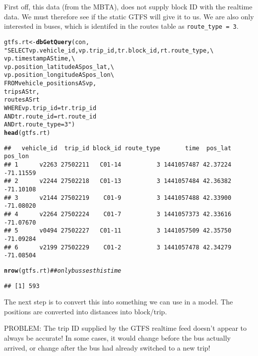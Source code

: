 \documentclass[10pt]{article}\usepackage[]{graphicx}\usepackage[]{color}
\makeatletter
\newcommand{\hlstr}[1]{\textcolor[rgb]{0.192,0.494,0.8}{#1}}%
\newcommand{\hlcom}[1]{\textcolor[rgb]{0.678,0.584,0.686}{\textit{#1}}}%
\newcommand{\hlstd}[1]{\textcolor[rgb]{0.345,0.345,0.345}{#1}}%
\newcommand{\hlkwb}[1]{\textcolor[rgb]{0.69,0.353,0.396}{#1}}%
\newcommand{\hlkwd}[1]{\textcolor[rgb]{0.737,0.353,0.396}{\textbf{#1}}}%
\newenvironment{kframe}{%
 \def\at@end@of@kframe{}%
 \ifinner\ifhmode%
  \def\at@end@of@kframe{\end{minipage}}%
  \begin{minipage}{\columnwidth}%
 \fi\fi%
 \def\FrameCommand##1{\hskip\@totalleftmargin \hskip-\fboxsep
 \colorbox{shadecolor}{##1}\hskip-\fboxsep
     \hskip-\linewidth \hskip-\@totalleftmargin \hskip\columnwidth}%
 \MakeFramed {\advance\hsize-\width
   \@totalleftmargin\z@ \linewidth\hsize
   \@setminipage}}%
 {\par\unskip\endMakeFramed%
 \at@end@of@kframe}
\newenvironment{knitrout}{}{} %
\makeatother
\begin{document}
First off, this data (from the MBTA), does not supply block ID with the realtime data.
We must therefore see if the static GTFS will give it to us.
We are also only interested in buses, which is identifed in the routes table as \texttt{route\_type = 3}.
\begin{knitrout}
\color{fgcolor}\begin{kframe}
\begin{alltt}
\hlstd{gtfs.rt} \hlkwb{<-} \hlkwd{dbGetQuery}\hlstd{(con,}
                      \hlstr{"SELECT vp.vehicle_id, vp.trip_id, tr.block_id, rt.route_type, \textbackslash{}
                              vp.timestamp AS time, \textbackslash{}
                              vp.position_latitude AS pos_lat, \textbackslash{}
                              vp.position_longitude AS pos_lon \textbackslash{}
                         FROM vehicle_positions AS vp, 
                              trips             AS tr, 
                              routes            AS rt
                        WHERE vp.trip_id    = tr.trip_id 
                          AND tr.route_id   = rt.route_id 
                          AND rt.route_type = 3"}\hlstd{)}
\hlkwd{head}\hlstd{(gtfs.rt)}
\end{alltt}
\begin{verbatim}
##   vehicle_id  trip_id block_id route_type       time  pos_lat   pos_lon
## 1      v2263 27502211   C01-14          3 1441057487 42.37224 -71.11559
## 2      v2244 27502218   C01-13          3 1441057484 42.36382 -71.10108
## 3      v2144 27502219    C01-9          3 1441057488 42.33900 -71.08020
## 4      v2264 27502224    C01-7          3 1441057373 42.33616 -71.07670
## 5      v0494 27502227   C01-11          3 1441057509 42.35750 -71.09284
## 6      v2199 27502229    C01-2          3 1441057478 42.34279 -71.08504
\end{verbatim}
\begin{alltt}
\hlkwd{nrow}\hlstd{(gtfs.rt)} \hlcom{## only busses this time}
\end{alltt}
\begin{verbatim}
## [1] 593
\end{verbatim}
\end{kframe}
\end{knitrout}
The next step is to convert this into something we can use in a model.
The positions are converted into distances into block/trip.

PROBLEM: The trip ID supplied by the GTFS realtime feed doesn't appear to always be
accurate! In some cases, it would change before the bus actually arrived, or change after
the bus had already switched to a new trip!
\end{document}
